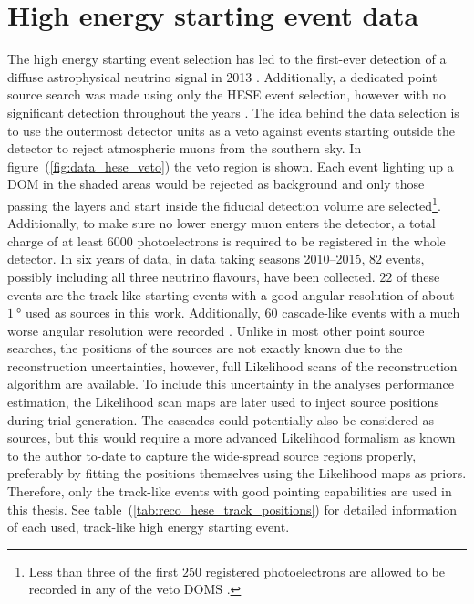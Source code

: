 \section{High energy starting event data}
The high energy starting event selection has led to the first-ever detection of a diffuse astrophysical neutrino signal in 2013 \cite{Aartsen:2013jdh}.
Additionally, a dedicated point source search was made using only the HESE event selection, however with no significant detection throughout the years \cite{Aartsen:2013rt,Aartsen:2014gkd,Kopper:2015vzf,Kopper:2017zzm}.
The idea behind the data selection is to use the outermost detector units as a veto against events starting outside the detector to reject atmospheric muons from the southern sky.
In figure~(\ref{fig:data_hese_veto}) the veto region is shown.
Each event lighting up a DOM in the shaded areas would be rejected as background and only those passing the layers and start inside the fiducial detection volume are selected\footnote{Less than three of the first $\num{250}$ registered photoelectrons are allowed to be recorded in any of the veto DOMS \cite{Kopper:2017zzm}.}.
Additionally, to make sure no lower energy muon enters the detector, a total charge of at least $\num{6000}$ photoelectrons is required to be registered in the whole detector.
In six years of data, in data taking seasons 2010--2015, $\num{82}$ events, possibly including all three neutrino flavours, have been collected.
$\num{22}$ of these events are the track-like starting events with a good angular resolution of about $\SI{1}{\degree}$ used as sources in this work.
Additionally, $\num{60}$ cascade-like events with a much worse angular resolution were recorded \cite{Kopper:2017zzm}.
Unlike in most other point source searches, the positions of the sources are not exactly known due to the reconstruction uncertainties, however, full Likelihood scans of the reconstruction algorithm are available.
To include this uncertainty in the analyses performance estimation, the Likelihood scan maps are later used to inject source positions during trial generation.
The cascades could potentially also be considered as sources, but this would require a more advanced Likelihood formalism as known to the author to-date to capture the wide-spread source regions properly, preferably by fitting the positions themselves using the Likelihood maps as priors.
Therefore, only the track-like events with good pointing capabilities are used in this thesis.
See table~(\ref{tab:reco_hese_track_positions}) for detailed information of each used, track-like high energy starting event.

